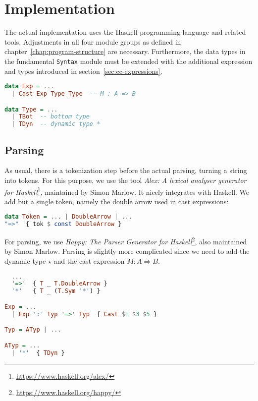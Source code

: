 \chapter{Implementation}\label{chap:implementation}

The actual implementation uses the Haskell programming language and related tools. Adjustments in all four module groups as defined in chapter~\ref{chap:program-structure} are necessary. Furthermore, the data types in the fundamental \texttt{Syntax} module must be extended with the additional expression and types introduced in section~\ref{sec:cc-expressions}.

\begin{lstlisting}[language=Haskell]
data Exp = ...
  | Cast Exp Type Type  -- M : A => B

data Type = ...
  | TBot  -- bottom type
  | TDyn  -- dynamic type *
\end{lstlisting}

\section{Parsing}

As usual, there is a tokenization step before the actual parsing, turning a string into tokens. For this purpose, we use the tool \emph{Alex: A lexical analyser generator for Haskell}\footnote{\url{https://www.haskell.org/alex/}}, maintained by Simon Marlow. It nicely integrates with Haskell. We add but a single token, namely the double arrow used in cast expressions:

\begin{lstlisting}[language=Haskell]
data Token = ... | DoubleArrow | ...
"=>"  { tok $ const DoubleArrow }
\end{lstlisting}

For parsing, we use \emph{Happy: The Parser Generator for Haskell}\footnote{\url{https://www.haskell.org/happy/}}, also maintained by Simon Marlow. Parsing is slightly more complicated since we need to add the dynamic type $\star$ and the cast expression $M : A \Rightarrow B$.

\begin{lstlisting}[language=Haskell]
%token
  ...
  '=>'  { T _ T.DoubleArrow }
  '*'   { T _ (T.Sym '*') }

Exp = ...
  | Exp ':' Typ '=>' Typ  { Cast $1 $3 $5 }

Typ = ATyp | ...

ATyp = ...
  | '*'  { TDyn }
\end{lstlisting}
